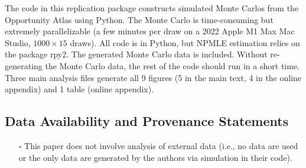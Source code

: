 \documentclass[10pt]{article}
\providecommand{\tightlist}{%
  \setlength{\itemsep}{0pt}\setlength{\parskip}{0pt}}
\begin{document}

The code in this replication package constructs simulated Monte Carlos from the
Opportunity Atlas \citep{DVN/NKCQM1_2022} using Python. The Monte Carlo is time-consuming
but extremely parallelizable (a few minutes per draw on a 2022 Apple M1 Max Mac Studio,
$1000 \times 15$ draws). All code is in Python, but NPMLE estimation relies on the package
rpy2. The generated Monte Carlo data is included. Without re-generating the Monte Carlo
data, the rest of the code should run in a short time. Three main analysis files generate
all 9 figures (5 in the main text, 4 in the online appendix) and 1 table (online
appendix).

\hypertarget{data-availability-and-provenance-statements}{%
\subsection{Data Availability and Provenance
Statements}\label{data-availability-and-provenance-statements}}


\begin{itemize}
\tightlist
\item[$\square$]
  This paper does not involve analysis of external data (i.e., no data
  are used or the only data are generated by the authors via simulation
  in their code).
\end{itemize}

\end{document}
